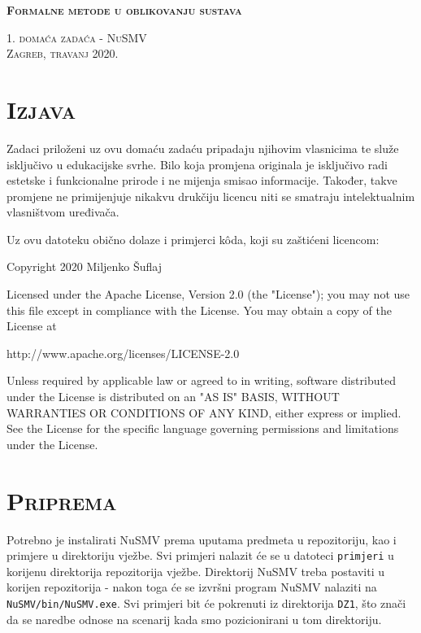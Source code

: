 \documentclass{article}
\newcommand{\crnotice}[1]
{
    \begin{center}
        \colorbox{red!15}{\parbox{\textwidth}{#1}}
    \end{center}
}
\newcommand{\sekcija}[1]{\section{\textsc{#1}}}
\newcommand{\code}[1]{\colorbox{blue!11}{\texttt{#1}}}
\begin{document}
\begin{titlepage}
    \centering
    \vspace*{\fill}

    \huge
    \textbf{\textsc{Formalne metode u oblikovanju sustava}} \\
    
    \vspace*{0.5cm}
    
    \large
    \textsc{1. domaća zadaća - NuSMV} \\

    \vspace*{\fill}
    \textsc{Zagreb, travanj 2020.}
\end{titlepage}

\tableofcontents
\pagebreak



\sekcija{Izjava}

Zadaci priloženi uz ovu domaću zadaću pripadaju njihovim vlasnicima te služe isključivo u edukacijske svrhe. Bilo koja promjena originala je isključivo radi estetske i funkcionalne prirode i ne mijenja smisao informacije. Također, takve promjene ne primijenjuje nikakvu drukčiju licencu niti se smatraju intelektualnim vlasništvom uređivača.
\newline

Uz ovu datoteku obično dolaze i primjerci kôda, koji su zaštićeni licencom:

\crnotice
{
    Copyright 2020 Miljenko Šuflaj
    \newline

    Licensed under the Apache License, Version 2.0 (the "License");
    you may not use this file except in compliance with the License.
    You may obtain a copy of the License at
    \newline

        \quad
        http://www.apache.org/licenses/LICENSE-2.0
        \newline

    Unless required by applicable law or agreed to in writing, software
    distributed under the License is distributed on an "AS IS" BASIS,
    WITHOUT WARRANTIES OR CONDITIONS OF ANY KIND, either express or implied.
    See the License for the specific language governing permissions and
    limitations under the License.
}

\sekcija{Priprema}

Potrebno je instalirati NuSMV prema uputama predmeta u repozitoriju, kao i primjere u direktoriju vježbe. Svi primjeri nalazit će se u datoteci \code{primjeri} u korijenu direktorija repozitorija vježbe. Direktorij NuSMV treba postaviti u korijen repozitorija - nakon toga će se izvršni program NuSMV nalaziti na \code{NuSMV/bin/NuSMV.exe}. Svi primjeri bit će pokrenuti iz direktorija \code{DZ1}, što znači da se naredbe odnose na scenarij kada smo pozicionirani u tom direktoriju.
\end{document}
